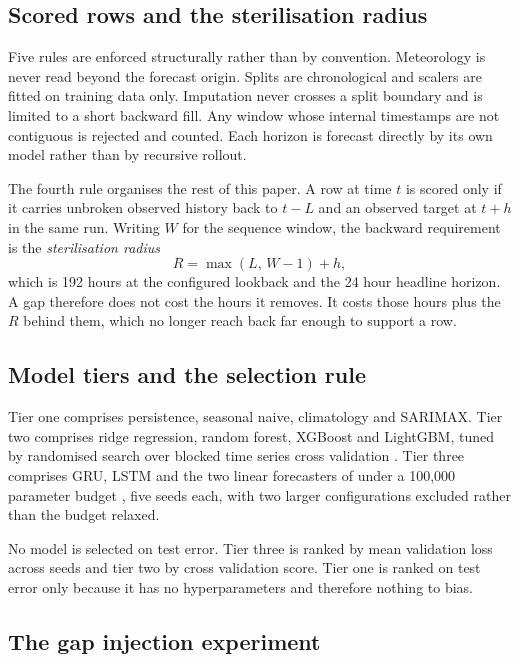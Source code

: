 \documentclass[conference]{IEEEtran}
\begin{document}
\subsection{Scored rows and the sterilisation radius}

Five rules are enforced structurally rather than by convention. Meteorology is never read
beyond the forecast origin. Splits are chronological and scalers are fitted on training data
only. Imputation never crosses a split boundary and is limited to a short backward fill. Any
window whose internal timestamps are not contiguous is rejected and counted. Each horizon is
forecast directly by its own model rather than by recursive rollout.

The fourth rule organises the rest of this paper. A row at time $t$ is scored only if it
carries unbroken observed history back to $t-L$ and an observed target at $t+h$ in the same
run. Writing $W$ for the sequence window, the backward requirement is the
\emph{sterilisation radius}
\begin{equation}
R=\max(L,\,W-1)+h ,
\label{eq:radius}
\end{equation}
which is 192 hours at the configured lookback and the 24 hour headline horizon. A gap
therefore does not cost the hours it removes. It costs those hours plus the $R$ behind them,
which no longer reach back far enough to support a row.

\subsection{Model tiers and the selection rule}

Tier one comprises persistence, seasonal naive, climatology and SARIMAX. Tier two comprises
ridge regression, random forest, XGBoost and LightGBM, tuned by randomised search over
blocked time series cross validation \cite{bergmeir2012}. Tier three comprises GRU, LSTM and
the two linear forecasters of \cite{zeng2023dlinear} under a 100{,}000 parameter budget \cite{schwartz2020},
five seeds each, with two larger configurations excluded rather than the budget relaxed.

No model is selected on test error. Tier three is ranked by mean validation loss across seeds
and tier two by cross validation score. Tier one is ranked on test error only because it has no
hyperparameters and therefore nothing to bias.

\subsection{The gap injection experiment}
\end{document}
